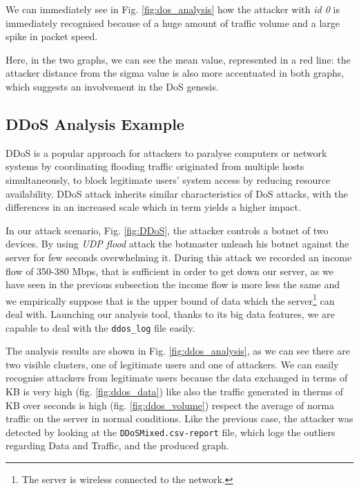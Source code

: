 We can immediately see in Fig. \ref{fig:dos_analysis} how the attacker with \textit{id 0} is immediately recognised because of a huge amount of traffic volume and a large spike in packet speed. 

Here, in the two graphs, we can see the mean value, represented in a red line: the attacker distance from the sigma value is also more accentuated in both graphs, which suggests an involvement in the DoS genesis.

\subsection{DDoS Analysis Example}
DDoS is a popular approach for attackers to paralyse computers or network systems by coordinating flooding traffic originated from multiple hosts simultaneously, to block legitimate users' system access by reducing resource availability. 
DDoS attack inherits similar characteristics of DoS attacks, with the differences in an increased scale which in term yields a higher impact\cite{ddos_forensics}.

In our attack scenario, Fig. \ref{fig:DDoS},  the attacker controls a botnet of two devices.
By using \textit{UDP flood} attack the botmaster unleash his botnet against the server for few seconds overwhelming it. 
During this attack we recorded an income flow of 350-380 Mbps, that is sufficient in order to get down our server, as we have seen in the previous subsection the income flow is more less the same and we empirically suppose that is the upper bound of data which the server\footnote{The server is wireless connected to the network.} can deal with.
Launching our analysis tool, thanks to its big data features, we are capable to deal with the \texttt{ddos\_log} file easily.

The analysis results are shown in Fig. \ref{fig:ddos_analysis}, as we can see there are two  visible clusters, one of legitimate users and one of attackers. 
We can easily recognise attackers from legitimate users because the data exchanged in terms of KB is very high (fig. \ref{fig:ddos_data}) like also the traffic generated in therms of KB over seconds is high (fig. \ref{fig:ddos_volume}) respect the average of norma traffic on the server in normal conditions. 
Like the previous case, the attacker was detected by looking at the \texttt{DDoSMixed.csv-report} file, which logs the outliers regarding Data and Traffic, and the produced graph.

